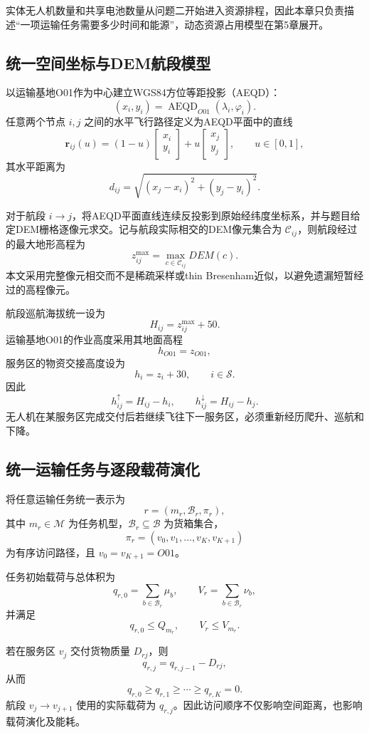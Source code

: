 \documentclass[UTF8,a4paper,12pt]{ctexart}
\begin{document}
实体无人机数量和共享电池数量从问题二开始进入资源排程，因此本章只负责描述“一项运输任务需要多少时间和能源”，动态资源占用模型在第5章展开。

\subsection{统一空间坐标与DEM航段模型}

以运输基地O01作为中心建立WGS84方位等距投影（AEQD）\cite{snyder1987}：
\[
(x_i,y_i)=\operatorname{AEQD}_{O01}(\lambda_i,\varphi_i).
\]
任意两个节点 $i,j$ 之间的水平飞行路径定义为AEQD平面中的直线
\[
\mathbf r_{ij}(u)
=
(1-u)
\begin{bmatrix}
x_i\\y_i
\end{bmatrix}
+
u
\begin{bmatrix}
x_j\\y_j
\end{bmatrix},
\qquad u\in[0,1],
\]
其水平距离为
\[
d_{ij}
=
\sqrt{(x_j-x_i)^2+(y_j-y_i)^2}.
\]

对于航段 $i\rightarrow j$，将AEQD平面直线连续反投影到原始经纬度坐标系，并与题目给定DEM栅格逐像元求交。记与航段实际相交的DEM像元集合为 $\mathcal C_{ij}$，则航段经过的最大地形高程为
\[
z_{ij}^{\max}
=
\max_{c\in\mathcal C_{ij}}DEM(c).
\]
本文采用完整像元相交而不是稀疏采样或thin Bresenham近似，以避免遗漏短暂经过的高程像元。

航段巡航海拔统一设为
\[
H_{ij}=z_{ij}^{\max}+50.
\]
运输基地O01的作业高度采用其地面高程
\[
h_{O01}=z_{O01},
\]
服务区的物资交接高度设为
\[
h_i=z_i+30,\qquad i\in\mathcal S.
\]
因此
\[
h_{ij}^{\uparrow}=H_{ij}-h_i,\qquad
h_{ij}^{\downarrow}=H_{ij}-h_j.
\]
无人机在某服务区完成交付后若继续飞往下一服务区，必须重新经历爬升、巡航和下降。

\subsection{统一运输任务与逐段载荷演化}

将任意运输任务统一表示为
\[
r=(m_r,\mathcal B_r,\pi_r),
\]
其中 $m_r\in\mathcal M$ 为任务机型，$\mathcal B_r\subseteq\mathcal B$ 为货箱集合，
\[
\pi_r=(v_0,v_1,\ldots,v_K,v_{K+1})
\]
为有序访问路径，且 $v_0=v_{K+1}=O01$。

任务初始载荷与总体积为
\[
q_{r,0}=\sum_{b\in\mathcal B_r}\mu_b,\qquad
V_r=\sum_{b\in\mathcal B_r}\nu_b,
\]
并满足
\[
q_{r,0}\le Q_{m_r},\qquad
V_r\le V_{m_r}.
\]

若在服务区 $v_j$ 交付货物质量 $D_{rj}$，则
\[
q_{r,j}=q_{r,j-1}-D_{rj},
\]
从而
\[
q_{r,0}\ge q_{r,1}\ge\cdots\ge q_{r,K}=0.
\]
航段 $v_j\rightarrow v_{j+1}$ 使用的实际载荷为 $q_{r,j}$。因此访问顺序不仅影响空间距离，也影响载荷演化及能耗。
\end{document}
